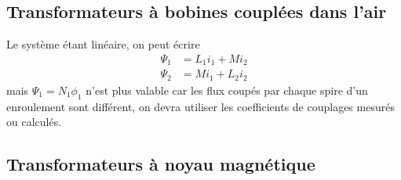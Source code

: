 	\subsection{Transformateurs à bobines couplées dans l'air}
		Le système étant linéaire, on peut écrire
		\begin{equation}
		\begin{array}{ll}
		\Psi_1 &= L_1i_1 + Mi_2\\
		\Psi_2 &= Mi_1 + L_2i_2
		\end{array}
		\end{equation}
		mais $\Psi_1=N_1\phi_1$ n'est plus valable car les flux coupés par chaque 
		spire d'un enroulement sont différent, on devra utiliser les coefficients 
		de couplages mesurés ou calculés.
		
	\subsection{Transformateurs à noyau magnétique}
